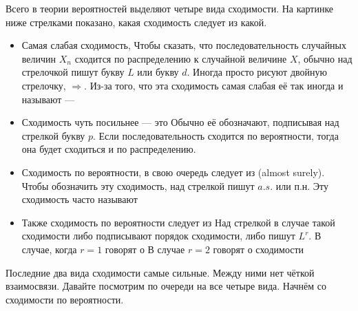 \documentclass[12pt, a4paper, oneside]{article}
\begin{document}
Всего в теории вероятностей выделяют четыре вида сходимости. На картинке ниже стрелками показано, какая сходимость следует из какой. 

\begin{center} 
\end{center} 

\begin{itemize} 
\item Самая слабая сходимость,  Чтобы сказать, что последовательность случайных величин $X_n$ сходится по распределению к случайной величине $X$, обычно над стрелочкой пишут букву $L$ или букву $d$. Иногда просто рисуют двойную стрелочку, $\Rightarrow$. Из-за того, что эта сходимость самая слабая её так иногда и называют --- 

\item Сходимость чуть посильнее --- это  Обычно её обозначают, подписывая над стрелкой букву $p$. Если последовательность сходится по вероятности, тогда она будет сходиться и по распределению. 

\item Сходимость по вероятности, в свою очередь следует из  (almost surely). Чтобы обозначить эту сходимость, над стрелкой пишут $a.s.$ или п.н. Эту сходимость часто называют  

\item Также сходимость по вероятности следует из  Над стрелкой в случае такой сходимости либо подписывают порядок сходимости, либо пишут $L^r$. В случае, когда $r=1$ говорят о  В случае $r=2$ говорят о сходимости 
\end{itemize} 

Последние два вида сходимости самые сильные. Между ними нет чёткой взаимосвязи. Давайте посмотрим по очереди на все четыре вида. Начнём со сходимости по вероятности. 
\end{document}
